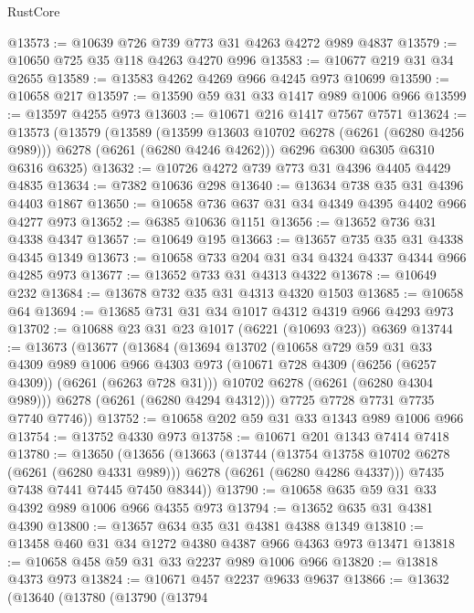\begin{lexlean}{RustCore}
\begin{coremodule}
@13573 := @10639 @726 @739 @773 @31 @4263 @4272 @989 @4837
@13579 := @10650 @725 @35 @118 @4263 @4270 @996
@13583 := @10677 @219 @31 @34 @2655
@13589 := @13583 @4262 @4269 @966 @4245 @973 @10699
@13590 := @10658 @217
@13597 := @13590 @59 @31 @33 @1417 @989 @1006 @966
@13599 := @13597 @4255 @973
@13603 := @10671 @216 @1417 @7567 @7571
@13624 := @13573
    (@13579
      (@13589
        (@13599 @13603 @10702 @6278 (@6261 (@6280 @4256 @989)))
        @6278
        (@6261 (@6280 @4246 @4262)))
      @6296
      @6300
      @6305
      @6310
      @6316
      @6325)
@13632 := @10726 @4272 @739 @773 @31 @4396 @4405 @4429 @4835
@13634 := @7382 @10636 @298
@13640 := @13634 @738 @35 @31 @4396 @4403 @1867
@13650 := @10658 @736 @637 @31 @34 @4349 @4395 @4402 @966 @4277 @973
@13652 := @6385 @10636 @1151
@13656 := @13652 @736 @31 @4338 @4347
@13657 := @10649 @195
@13663 := @13657 @735 @35 @31 @4338 @4345 @1349
@13673 := @10658 @733 @204 @31 @34 @4324 @4337 @4344 @966 @4285 @973
@13677 := @13652 @733 @31 @4313 @4322
@13678 := @10649 @232
@13684 := @13678 @732 @35 @31 @4313 @4320 @1503
@13685 := @10658 @64
@13694 := @13685 @731 @31 @34 @1017 @4312 @4319 @966 @4293 @973
@13702 := @10688 @23 @31 @23 @1017 (@6221 (@10693 @23)) @6369
@13744 := @13673
    (@13677
      (@13684
        (@13694
          @13702
          (@10658
            @729
            @59
            @31
            @33
            @4309
            @989
            @1006
            @966
            @4303
            @973
            (@10671 @728 @4309 (@6256 (@6257 @4309)) (@6261 (@6263 @728 @31)))
            @10702
            @6278
            (@6261 (@6280 @4304 @989)))
          @6278
          (@6261 (@6280 @4294 @4312)))
        @7725
        @7728
        @7731
        @7735
        @7740
        @7746))
@13752 := @10658 @202 @59 @31 @33 @1343 @989 @1006 @966
@13754 := @13752 @4330 @973
@13758 := @10671 @201 @1343 @7414 @7418
@13780 := @13650
    (@13656
      (@13663
        (@13744
          (@13754 @13758 @10702 @6278 (@6261 (@6280 @4331 @989)))
          @6278
          (@6261 (@6280 @4286 @4337)))
        @7435
        @7438
        @7441
        @7445
        @7450
        @8344))
@13790 := @10658 @635 @59 @31 @33 @4392 @989 @1006 @966 @4355 @973
@13794 := @13652 @635 @31 @4381 @4390
@13800 := @13657 @634 @35 @31 @4381 @4388 @1349
@13810 := @13458 @460 @31 @34 @1272 @4380 @4387 @966 @4363 @973 @13471
@13818 := @10658 @458 @59 @31 @33 @2237 @989 @1006 @966
@13820 := @13818 @4373 @973
@13824 := @10671 @457 @2237 @9633 @9637
@13866 := @13632
    (@13640
      (@13780
        (@13790
          (@13794

\end{coremodule}
\end{lexlean}

